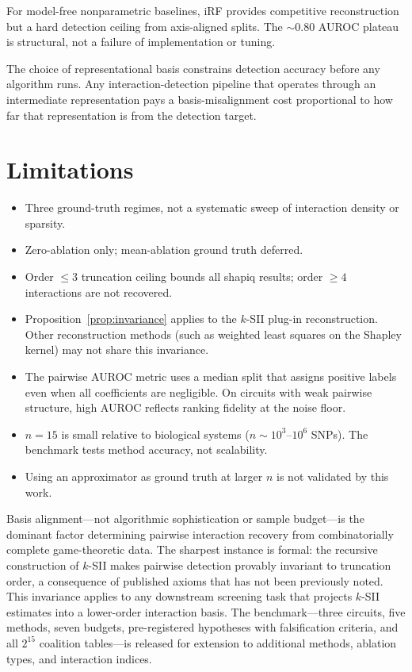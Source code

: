 \documentclass[11pt]{article}
\begin{document}
For model-free nonparametric baselines, iRF provides competitive
reconstruction but a hard detection ceiling from axis-aligned
splits. The $\sim$0.80 AUROC plateau is structural, not a failure
of implementation or tuning.

The choice of representational basis constrains detection accuracy
before any algorithm runs. Any interaction-detection pipeline that
operates through an intermediate representation pays a
basis-misalignment cost proportional to how far that
representation is from the detection target.


\section{Limitations}
\label{sec:limitations}

\begin{itemize}
\item Three ground-truth regimes, not a systematic sweep of
      interaction density or sparsity.
\item Zero-ablation only; mean-ablation ground truth deferred.
\item Order $\leq 3$ truncation ceiling bounds all shapiq results;
      order $\geq 4$ interactions are not recovered.
\item Proposition~\ref{prop:invariance} applies to the $k$-SII
      plug-in reconstruction. Other reconstruction methods (such as
      weighted least squares on the Shapley kernel) may not share
      this invariance.
\item The pairwise AUROC metric uses a median split that assigns
      positive labels even when all coefficients are negligible.
      On circuits with weak pairwise structure, high AUROC reflects
      ranking fidelity at the noise floor.
\item $n = 15$ is small relative to biological systems
      ($n \sim 10^3$--$10^6$ SNPs). The benchmark tests method
      accuracy, not scalability.
\item Using an approximator as ground truth at larger $n$ is not
      validated by this work.
\end{itemize}


Basis alignment---not algorithmic sophistication or sample
budget---is the dominant factor determining pairwise interaction
recovery from combinatorially complete game-theoretic data.
The sharpest instance is formal: the recursive construction of
$k$-SII makes pairwise detection provably invariant to truncation
order, a consequence of published axioms that has not been
previously noted. This invariance applies to any downstream
screening task that projects $k$-SII estimates into a lower-order
interaction basis. The benchmark---three circuits, five methods,
seven budgets, pre-registered hypotheses with falsification
criteria, and all $2^{15}$ coalition tables---is released for
extension to additional methods, ablation types, and interaction
indices.
\end{document}
